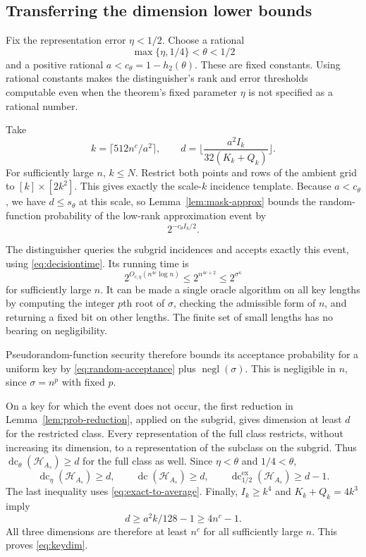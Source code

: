 \documentclass[11pt,letterpaper,pmlr,twoside]{jmlr}
\newcommand{\Hc}{\mathcal H}
\newcommand{\dc}{\operatorname{dc}}
\newcommand{\edc}{\operatorname{dc}^{\mathrm{ex}}_{1/2}}
\newcommand{\negl}{\operatorname{negl}}
\newcommand{\floor}[1]{\lfloor #1\rfloor}
\newcommand{\ceil}[1]{\lceil #1\rceil}
\newcommand{\hbin}{h_2}
\begin{document}
\subsection{Transferring the dimension lower bounds}
Fix the representation error $\eta<1/2$. Choose a rational
\[
 \max\{\eta,1/4\}<\theta<1/2
\]
and a positive rational $a<c_\theta=1-\hbin(\theta)$. These are fixed constants. Using rational constants makes the distinguisher's rank and error thresholds computable even when the theorem's fixed parameter $\eta$ is not specified as a rational number.

Take
\begin{equation}
 k=\ceil{512n^c/a^2},\qquad
 d=\floor{\frac{a^2 I_k}{32(K_k+Q_k)}}.
\label{eq:subgridparameters}
\end{equation}
For sufficiently large $n$, $k\le N$. Restrict both points and rows of the ambient grid to $[k]\times[2k^2]$. This gives exactly the scale-$k$ incidence template. Because $a<c_\theta$, we have $d\le s_\theta$ at this scale, so Lemma~\ref{lem:mask-approx} bounds the random-function probability of the low-rank approximation event by
\begin{equation}
 2^{-c_\theta I_k/2}.
\label{eq:random-acceptance}
\end{equation}

The distinguisher queries the subgrid incidences and accepts exactly this event, using \eqref{eq:decisiontime}. Its running time is
\[
 2^{O_{c,\eta}(n^{4c}\log n)}
 \le2^{n^{4c+2}}
 \le2^{\sigma^\kappa}
\]
for sufficiently large $n$. It can be made a single oracle algorithm on all key lengths by computing the integer $p$th root of $\sigma$, checking the admissible form of $n$, and returning a fixed bit on other lengths. The finite set of small lengths has no bearing on negligibility.

Pseudorandom-function security therefore bounds its acceptance probability for a uniform key by \eqref{eq:random-acceptance} plus $\negl(\sigma)$. This is negligible in $n$, since $\sigma=n^p$ with fixed $p$.

On a key for which the event does not occur, the first reduction in Lemma~\ref{lem:prob-reduction}, applied on the subgrid, gives dimension at least $d$ for the restricted class. Every representation of the full class restricts, without increasing its dimension, to a representation of the subclass on the subgrid. Thus $\dc_\theta(\Hc_{A_s})\ge d$ for the full class as well. Since $\eta<\theta$ and $1/4<\theta$,
\[
 \dc_\eta(\Hc_{A_s})\ge d,\qquad
 \dc(\Hc_{A_s})\ge d,\qquad
 \edc(\Hc_{A_s})\ge d-1.
\]
The last inequality uses \eqref{eq:exact-to-average}. Finally, $I_k\ge k^4$ and $K_k+Q_k=4k^3$ imply
\[
 d\ge a^2k/128-1\ge4n^c-1.
\]
All three dimensions are therefore at least $n^c$ for all sufficiently large $n$. This proves \eqref{eq:keydim}.
\end{document}
